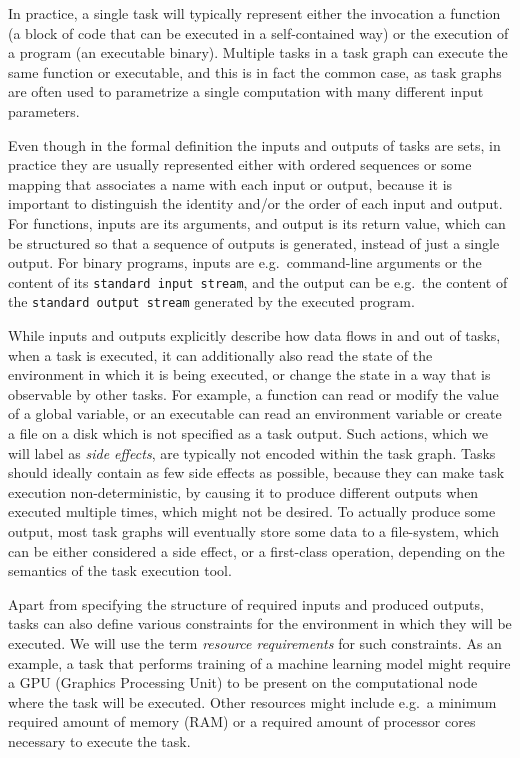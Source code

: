 In practice, a single task will typically represent either the invocation a function (a block of
code that can be executed in a self-contained way) or the execution of a program (an executable
binary). Multiple tasks in a task graph can execute the same function or executable, and this is in
fact the common case, as task graphs are often used to parametrize a single computation with many
different input parameters.

Even though in the formal definition the inputs and outputs of tasks are sets, in practice they are
usually represented either with ordered sequences or some mapping that associates a name with each
input or output, because it is important to distinguish the identity and/or the order of each input
and output. For functions, inputs are its arguments, and output is its return value, which can be
structured so that a sequence of outputs is generated, instead of just a single output. For binary
programs, inputs are e.g.\ command-line arguments or the content of its \texttt{standard input stream}, and
the output can be e.g.\ the content of the \texttt{standard output stream} generated by the executed
program.

While inputs and outputs explicitly describe how data flows in and out of tasks, when a task is
executed, it can additionally also read the state of the environment in which it is being executed,
or change the state in a way that is observable by other tasks. For example, a function can read or
modify the value of a global variable, or an executable can read an environment variable or create
a file on a disk which is not specified as a task output. Such actions, which we will label as
\emph{side effects}, are typically not encoded within the task graph. Tasks should ideally
contain as few side effects as possible, because they can make task execution non-deterministic, by
causing it to produce different outputs when executed multiple times, which might not be desired.
To actually produce some output, most task graphs will eventually store some data to a file-system,
which can be either considered a side effect, or a first-class operation, depending on the
semantics of the task execution tool.

Apart from specifying the structure of required inputs and produced outputs, tasks can also define
various constraints for the environment in which they will be executed. We will use the term
\emph{resource requirements} for such constraints. As an example, a task that performs training of a
machine learning model might require a GPU (Graphics Processing Unit) to be present on the
computational node where the task will be executed. Other resources might include e.g.\ a minimum
required amount of memory (RAM) or a required amount of processor cores necessary to execute the
task.


